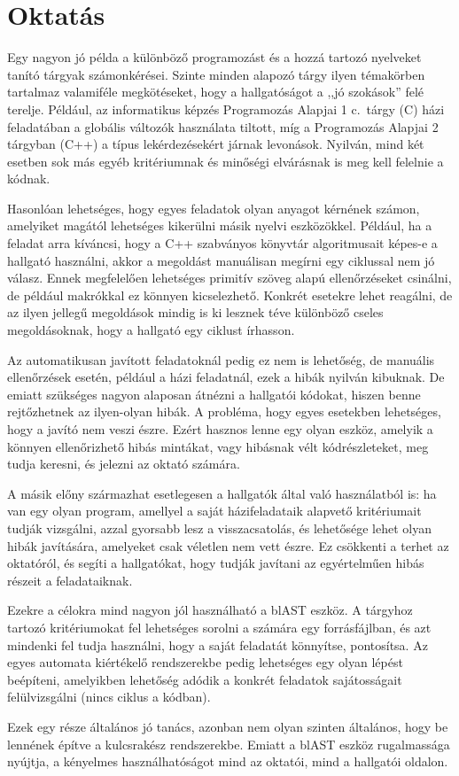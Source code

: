 \section{Oktatás}

Egy nagyon jó példa a különböző programozást és a hozzá tartozó nyelveket tanító tárgyak számonkérései.
Szinte minden alapozó tárgy ilyen témakörben tartalmaz valamiféle megkötéseket, hogy a hallgatóságot a ,,jó szokások'' felé terelje.
Például, az informatikus képzés Programozás Alapjai 1 c.~tárgy (C) házi feladatában a globális változók használata tiltott, míg a Programozás Alapjai 2 tárgyban (C++) a típus lekérdezésekért járnak levonások.
Nyilván, mind két esetben sok más egyéb kritériumnak és minőségi elvárásnak is meg kell felelnie a kódnak.

Hasonlóan lehetséges, hogy egyes feladatok olyan anyagot kérnének számon, amelyiket magától lehetséges kikerülni másik nyelvi eszközökkel.
Például, ha a feladat arra kíváncsi, hogy a C++ szabványos könyvtár algoritmusait képes-e a hallgató használni, akkor a megoldást manuálisan megírni egy ciklussal nem jó válasz.
Ennek megfelelően lehetséges primitív szöveg alapú ellenőrzéseket csinálni, de például makrókkal ez könnyen kicselezhető.
Konkrét esetekre lehet reagálni, de az ilyen jellegű megoldások mindig is ki lesznek téve különböző cseles megoldásoknak, hogy a hallgató egy ciklust írhasson.

Az automatikusan javított feladatoknál pedig ez nem is lehetőség, de manuális ellenőrzések esetén, például a házi feladatnál, ezek a hibák nyilván kibuknak.
De emiatt szükséges nagyon alaposan átnézni a hallgatói kódokat, hiszen benne rejtőzhetnek az ilyen-olyan hibák.
A probléma, hogy egyes esetekben lehetséges, hogy a javító nem veszi észre.
Ezért hasznos lenne egy olyan eszköz, amelyik a könnyen ellenőrizhető hibás mintákat, vagy hibásnak vélt kódrészleteket, meg tudja keresni, és jelezni az oktató számára.

A másik előny származhat esetlegesen a hallgatók által való használatból is: ha van egy olyan program, amellyel a saját házifeladataik alapvető kritériumait tudják vizsgálni, azzal gyorsabb lesz a visszacsatolás, és lehetősége lehet olyan hibák javítására, amelyeket csak véletlen nem vett észre.
Ez csökkenti a terhet az oktatóról, és segíti a hallgatókat, hogy tudják javítani az egyértelműen hibás részeit a feladataiknak.

Ezekre a célokra mind nagyon jól használható a blAST eszköz.
A tárgyhoz tartozó kritériumokat fel lehetséges sorolni a számára egy forrásfájlban, és azt mindenki fel tudja használni, hogy a saját feladatát könnyítse, pontosítsa.
Az egyes automata kiértékelő rendszerekbe pedig lehetséges egy olyan lépést beépíteni, amelyikben lehetőség adódik a konkrét feladatok sajátosságait felülvizsgálni (\pl nincs ciklus a kódban).

Ezek egy része általános jó tanács, azonban nem olyan szinten általános, hogy be lennének építve a kulcsrakész rendszerekbe.
Emiatt a blAST eszköz rugalmassága nyújtja, a kényelmes használhatóságot mind az oktatói, mind a hallgatói oldalon.

